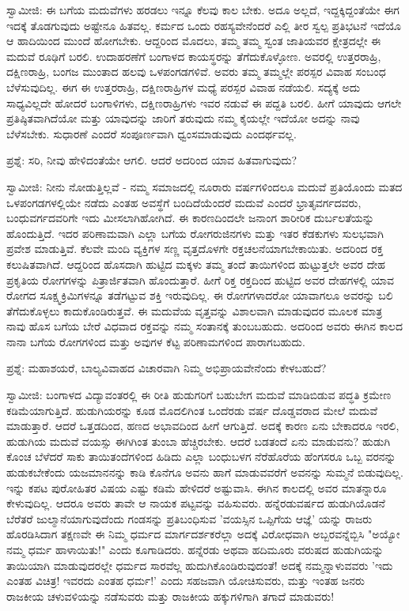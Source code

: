 ಸ್ವಾಮೀಜಿ: ಈ ಬಗೆಯ ಮದುವೆಗಳು ಹರಡಲು ಇನ್ನೂ ಕೆಲವು ಕಾಲ ಬೇಕು. ಅದೂ ಅಲ್ಲದೆ, ಇದ್ದಕ್ಕಿದ್ದಂತೆಯೇ ಈಗ ಇದಕ್ಕೆ ತೊಡಗುವುದು ಅಷ್ಟೇನೂ ಹಿತವಲ್ಲ. ಕರ್ಮದ ಒಂದು ರಹಸ್ಯವೇನೆಂದರೆ ಎಲ್ಲಿ ತೀರ ಸ್ವಲ್ಪ ಪ್ರತಿಭಟನೆ ಇದೆಯೊ ಆ ಹಾದಿಯಿಂದ ಮುಂದೆ ಹೋಗಬೇಕು. ಆದ್ದರಿಂದ ಮೊದಲು, ತಮ್ಮ ತಮ್ಮ ಸ್ವಂತ ಜಾತಿಯವರ ಕ್ಷೇತ್ರದಲ್ಲೇ ಈ ಮದುವೆ ರೂಢಿಗೆ ಬರಲಿ. ಉದಾಹರಣೆಗೆ ಬಂಗಾಳದ ಕಾಯಸ್ಥರನ್ನು ತೆಗೆದುಕೊಳ್ಳೋಣ. ಅವರಲ್ಲಿ ಉತ್ತರರಾಹ್ರಿ, ದಕ್ಷಿಣರಾಹ್ರಿ, ಬಂಗಜ ಮುಂತಾದ ಹಲವು ಒಳಪಂಗಡಗಳಿವೆ. ಅವರು ತಮ್ಮ ತಮ್ಮಲ್ಲೇ ಪರಸ್ಪರ ವಿವಾಹ ಸಂಬಂಧ ಬೆಳೆಸುವುದಿಲ್ಲ. ಈಗ ಈ ಉತ್ತರರಾಹ್ರಿ, ದಕ್ಷಿಣರಾಹ್ರಿಗಳ ಮಧ್ಯೆ ಪರಸ್ಪರ ವಿವಾಹ ನಡೆಯಲಿ. ಸದ್ಯಕ್ಕೆ ಅದು ಸಾಧ್ಯವಿಲ್ಲದೇ ಹೋದರೆ ಬಂಗಾಳಿಗಳು, ದಕ್ಷಿಣರಾಹ್ರಿಗಳು ಇವರ ನಡುವೆ ಈ ಪದ್ದತಿ ಬರಲಿ. ಹೀಗೆ ಯಾವುದು ಆಗಲೇ ಪ್ರತಿಷ್ಠಿತವಾಗಿದೆಯೋ ಮತ್ತು ಯಾವುದನ್ನು ಜಾರಿಗೆ ತರುವುದು ನಮ್ಮ ಕೈಯಲ್ಲೇ ಇದೆಯೋ ಅದನ್ನು ನಾವು ಬೆಳೆಸಬೇಕು. ಸುಧಾರಣೆ ಎಂದರೆ ಸಂಪೂರ್ಣವಾಗಿ ಧ್ವಂಸಮಾಡುವುದು ಎಂದರ್ಥವಲ್ಲ.

ಪ್ರಶ್ನೆ: ಸರಿ, ನೀವು ಹೇಳಿದಂತೆಯೇ ಆಗಲಿ. ಆದರೆ ಅದರಿಂದ ಯಾವ ಹಿತವಾಗುವುದು?

ಸ್ವಾಮೀಜಿ: ನೀನು ನೋಡುತ್ತಿಲ್ಲವೆ - ನಮ್ಮ ಸಮಾಜದಲ್ಲಿ ನೂರಾರು ವರ್ಷಗಳಿಂದಲೂ ಮದುವೆ ಪ್ರತಿಯೊಂದು ಮತದ ಒಳಪಂಗಡಗಳಲ್ಲಿಯೇ ನಡೆದು ಎಂತಹ ಅವಸ್ಥೆಗೆ ಬಂದಿದೆಯೆಂದರೆ ಮದುವೆ ಎಂದರೆ ಭ್ರಾತೃವರ್ಗದವರು, ಬಂಧುವರ್ಗದವರಿಗೇ ಇದು ಮೀಸಲಾಗಿಹೋಗಿದೆ. ಈ ಕಾರಣದಿಂದಲೇ ಜನಾಂಗ ಶಾರೀರಿಕ ದುರ್ಬಲತೆಯನ್ನು ಹೊಂದುತ್ತಿದೆ. ಇದರ ಪರಿಣಾಮವಾಗಿ ಎಲ್ಲಾ ಬಗೆಯ ರೋಗರುಜಿನಗಳು ಮತ್ತು ಇತರ ಕೆಡಕುಗಳು ಸುಲಭವಾಗಿ ಪ್ರವೇಶ ಮಾಡುತ್ತಿವೆ. ಕೆಲವೇ ಮಂದಿ ವ್ಯಕ್ತಿಗಳ ಸಣ್ಣ ವೃತ್ತದೊಳಗೇ ರಕ್ತಚಲನೆಯಾಗಬೇಕಾಯಿತು. ಅದರಿಂದ ರಕ್ತ ಕಲುಷಿತವಾಗಿದೆ. ಆದ್ದರಿಂದ ಹೊಸದಾಗಿ ಹುಟ್ಟಿದ ಮಕ್ಕಳು ತಮ್ಮ ತಂದೆ ತಾಯಿಗಳಿಂದ ಹುಟ್ಟುತ್ತಲೇ ಅವರ ದೇಹ ಪ್ರಕೃತಿಯ ರೋಗಗಳನ್ನು ಪಿತ್ರಾರ್ಜಿತವಾಗಿ ಹೊಂದುತ್ತಾರೆ. ಹೀಗೆ ರಿಕ್ತ ರಕ್ತದಿಂದ ಹುಟ್ಟಿದ ಅವರ ದೇಹಗಳಲ್ಲಿ ಯಾವ ರೋಗದ ಸೂಕ್ಷ್ಮಕ್ರಿಮಿಗಳನ್ನೂ ತಡೆಗಟ್ಟುವ ಶಕ್ತಿ ಇರುವುದಿಲ್ಲ. ಈ ರೋಗಗಳಾದರೋ ಯಾವಾಗಲೂ ಅವರನ್ನು ಬಲಿ ತೆಗೆದುಕೊಳ್ಳಲು ಕಾದುಕೊಂಡಿರುತ್ತವೆ. ಈ ಮದುವೆಯ ವೃತ್ತವನ್ನು ವಿಶಾಲವಾಗಿ ಮಾಡುವುದರ ಮೂಲಕ ಮಾತ್ರ ನಾವು ಹೊಸ ಬಗೆಯ ಬೇರೆ ವಿಧವಾದ ರಕ್ತವನ್ನು ನಮ್ಮ ಸಂತಾನಕ್ಕೆ ತುಂಬಬಹುದು. ಅದರಿಂದ ಅವರು ಈಗಿನ ಕಾಲದ ನಾನಾ ಬಗೆಯ ರೋಗಗಳಿಂದ ಮತ್ತು ಅವುಗಳ ಕೆಟ್ಟ ಪರಿಣಾಮಗಳಿಂದ ಪಾರಾಗಬಹುದು.

ಪ್ರಶ್ನೆ: ಮಹಾಶಯರೆ, ಬಾಲ್ಯವಿವಾಹದ ವಿಚಾರವಾಗಿ ನಿಮ್ಮ ಅಭಿಪ್ರಾಯವೇನೆಂದು ಕೇಳಬಹುದೆ?

ಸ್ವಾಮೀಜಿ: ಬಂಗಾಳದ ವಿದ್ಯಾವಂತರಲ್ಲಿ ಈ ರೀತಿ ಹುಡುಗರಿಗೆ ಬಹುಬೇಗ ಮದುವೆ ಮಾಡಿಬಿಡುವ ಪದ್ಧತಿ ಕ್ರಮೇಣ ಕಡಿಮೆಯಾಗುತ್ತಿದೆ. ಹುಡುಗಿಯರನ್ನು ಕೂಡ ಮೊದಲಿಗಿಂತ ಒಂದೆರಡು ವರ್ಷ ದೊಡ್ಡವರಾದ ಮೇಲೆ ಮದುವೆ ಮಾಡುತ್ತಾರೆ. ಆದರೆ ಒತ್ತಡದಿಂದ, ಹಣದ ಅಭಾವದಿಂದ ಹೀಗೆ ಆಗುತ್ತಿದೆ. ಅದಕ್ಕೆ ಕಾರಣ ಏನು ಬೇಕಾದರೂ ಇರಲಿ, ಹುಡುಗಿಯ ಮದುವೆ ವಯಸ್ಸು ಈಗಿಗಿಂತ ತುಂಬಾ ಹೆಚ್ಚಿರಬೇಕು. ಆದರೆ ಬಡತಂದೆ ಏನು ಮಾಡುವನು? ಹುಡುಗಿ ಕೊಂಚ ಬೆಳೆದರೆ ಸಾಕು ತಾಯಿತಂದೆಗಳಿಂದ ಹಿಡಿದು ಎಲ್ಲಾ ಬಂಧುಬಳಗ ನೆರೆಹೊರೆಯ ಹೆಂಗಸರೂ ಒಬ್ಬ ವರನನ್ನು ಹುಡುಕಬೇಕೆಂದು ಯಜಮಾನನನ್ನು ಕಾಡಿ ಕೊನೆಗೂ ಅವನು ಹಾಗೆ ಮಾಡುವವರೆಗೆ ಅವನನ್ನು ಸುಮ್ಮನೆ ಬಿಡುವುದಿಲ್ಲ. ಇನ್ನು ಕಪಟ ಪುರೋಹಿತರ ವಿಷಯ ಎಷ್ಟು ಕಡಿಮೆ ಹೇಳಿದರೆ ಅಷ್ಟುವಾಸಿ. ಈಗಿನ ಕಾಲದಲ್ಲಿ ಅವರ ಮಾತನ್ನಾರೂ ಕೇಳುವುದಿಲ್ಲ. ಆದರೂ ಅವರು ತಾವೇ ಆ ನಾಯಕ ಪಟ್ಟವನ್ನು ವಹಿಸುವರು. ಹನ್ನೆರಡುವರ್ಷದ ಹುಡುಗಿಯೊಡನೆ ಬೆರೆತರೆ ಜುಲ್ಮಾನೆಯಾಗುವುದೆಂದು ಗಂಡಸನ್ನು ಪ್ರತಿಬಂಧಿಸುವ 'ವಯಸ್ಸಿನ ಒಪ್ಪಿಗೆಯ ಆಜ್ಞೆ'  ಯನ್ನು ರಾಜರು ಹೊರಡಿಸಿದಾಗ ತಕ್ಷಣವೇ ಈ ನಿಮ್ಮ ಧರ್ಮದ ಮಾರ್ಗದರ್ಶಕರೆಲ್ಲಾ ಅದಕ್ಕೆ ವಿರೋಧವಾಗಿ ಅಬ್ಬರವನ್ನೆಬ್ಬಿಸಿ "ಅಯ್ಯೋ ನಮ್ಮ ಧರ್ಮ ಹಾಳಾಯಿತು!" ಎಂದು ಕೂಗಾಡಿದರು. ಹನ್ನೆರಡು ಅಥವಾ ಹದಿಮೂರು ವರುಷದ ಹುಡುಗಿಯನ್ನು ತಾಯಿಯಾಗಿ ಮಾಡುವುದರಲ್ಲೇ ಧರ್ಮದ ಸಾರವೆಲ್ಲ ಹುದುಗಿಕೊಂಡಿರುವುದಂತೆ! ಅದಕ್ಕೆ ನಮ್ಮನ್ನಾಳುವವರು 'ಇದು ಎಂತಹ ವಿಚಿತ್ರ! ಇವರದು ಎಂತಹ ಧರ್ಮ!' ಎಂದು ಸಹಜವಾಗಿ ಯೋಚಿಸುವರು, ಮತ್ತು ಇಂತಹ ಜನರು ರಾಜಕೀಯ ಚಳುವಳಿಯನ್ನು ನಡೆಸುವರು ಮತ್ತು ರಾಜಕೀಯ ಹಕ್ಕುಗಳಿಗಾಗಿ ತಗಾದೆ ಮಾಡುವರು!

